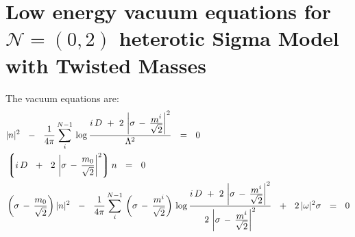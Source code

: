 \documentclass{article}
\newcommand{\mc}[1]{\mathcal{#1}}
\newcommand{\lgr}{\left\lgroup}
\newcommand{\rgr}{\right\rgroup}
\begin{document}
\section*{Low energy vacuum equations for $\mc{N}=(0,2)$ heterotic Sigma Model with Twisted Masses}

	The vacuum equations are:
\begin{align*}
%
	&
	|n|^2  ~~-~~  \frac{1}{4\pi} \sum_i^{N-1}\, 
		{\rm log}\, 
		\frac{i\,D ~+~ 2\, \left| \sigma \,-\, \frac{\displaystyle m^i}{\displaystyle \sqrt{2}} \right|^2}
							{\Lambda^2}   ~~=~~ 0 \\				
%
	&
	\lgr i\, D ~~+~~ 2\,\left|\sigma \,-\, \frac{m_0}{\sqrt{2}}\right|^2 \rgr n ~~=~~ 0 \\
%
&
	\left(\sigma \,-\, \frac{m_0}{\sqrt{2}}\right)|n|^2 
		~~-~~ 
	\frac{1}{4\pi} \sum_i^{N-1}\,
			\left(\sigma \,-\, \frac{m^i}{\sqrt{2}}\right)\,
		{\rm log}\, 
		\frac{i\,D ~+~ 2\, \left| \sigma \,-\, \frac{\displaystyle m^i}{\displaystyle \sqrt{2}} \right|^2}
		{2\, \left| \sigma \,-\, \frac{\displaystyle m^i}{\displaystyle \sqrt{2}} \right|^2}
		~~+~~ 2\, |\omega|^2\sigma ~~=~~ 0
\end{align*}
\end{document}
